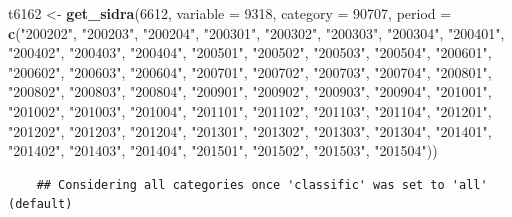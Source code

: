 \documentclass[11pt, a4paper]{report}
\newenvironment{Shaded}{\begin{snugshade}}{\end{snugshade}}
\newcommand{\DataTypeTok}[1]{\textcolor[rgb]{0.13,0.29,0.53}{#1}}
\newcommand{\DecValTok}[1]{\textcolor[rgb]{0.00,0.00,0.81}{#1}}
\newcommand{\KeywordTok}[1]{\textcolor[rgb]{0.13,0.29,0.53}{\textbf{#1}}}
\newcommand{\NormalTok}[1]{#1}
\newcommand{\StringTok}[1]{\textcolor[rgb]{0.31,0.60,0.02}{#1}}
\theoremstyle{plain}
\theoremstyle{plain}
\theoremstyle{remark}
\begin{document}
\begin{Shaded}
	\begin{Highlighting}[]
		\NormalTok{t6162 <-}\StringTok{ }\KeywordTok{get_sidra}\NormalTok{(}\DecValTok{6612}\NormalTok{, }\DataTypeTok{variable =} \DecValTok{9318}\NormalTok{, }\DataTypeTok{category =} \DecValTok{90707}\NormalTok{, }\DataTypeTok{period =} \KeywordTok{c}\NormalTok{(}\StringTok{"200202"}\NormalTok{, }
		\StringTok{"200203"}\NormalTok{, }\StringTok{"200204"}\NormalTok{, }\StringTok{"200301"}\NormalTok{, }\StringTok{"200302"}\NormalTok{, }\StringTok{"200303"}\NormalTok{, }\StringTok{"200304"}\NormalTok{, }
		\StringTok{"200401"}\NormalTok{, }\StringTok{"200402"}\NormalTok{, }\StringTok{"200403"}\NormalTok{, }\StringTok{"200404"}\NormalTok{, }\StringTok{"200501"}\NormalTok{, }\StringTok{"200502"}\NormalTok{, }
		\StringTok{"200503"}\NormalTok{, }\StringTok{"200504"}\NormalTok{, }\StringTok{"200601"}\NormalTok{, }\StringTok{"200602"}\NormalTok{, }\StringTok{"200603"}\NormalTok{, }\StringTok{"200604"}\NormalTok{, }
		\StringTok{"200701"}\NormalTok{, }\StringTok{"200702"}\NormalTok{, }\StringTok{"200703"}\NormalTok{, }\StringTok{"200704"}\NormalTok{, }\StringTok{"200801"}\NormalTok{, }\StringTok{"200802"}\NormalTok{, }
		\StringTok{"200803"}\NormalTok{, }\StringTok{"200804"}\NormalTok{, }\StringTok{"200901"}\NormalTok{, }\StringTok{"200902"}\NormalTok{, }\StringTok{"200903"}\NormalTok{, }\StringTok{"200904"}\NormalTok{, }
		\StringTok{"201001"}\NormalTok{, }\StringTok{"201002"}\NormalTok{, }\StringTok{"201003"}\NormalTok{, }\StringTok{"201004"}\NormalTok{, }\StringTok{"201101"}\NormalTok{, }\StringTok{"201102"}\NormalTok{, }
		\StringTok{"201103"}\NormalTok{, }\StringTok{"201104"}\NormalTok{, }\StringTok{"201201"}\NormalTok{, }\StringTok{"201202"}\NormalTok{, }\StringTok{"201203"}\NormalTok{, }\StringTok{"201204"}\NormalTok{, }
		\StringTok{"201301"}\NormalTok{, }\StringTok{"201302"}\NormalTok{, }\StringTok{"201303"}\NormalTok{, }\StringTok{"201304"}\NormalTok{, }\StringTok{"201401"}\NormalTok{, }\StringTok{"201402"}\NormalTok{, }
		\StringTok{"201403"}\NormalTok{, }\StringTok{"201404"}\NormalTok{, }\StringTok{"201501"}\NormalTok{, }\StringTok{"201502"}\NormalTok{, }\StringTok{"201503"}\NormalTok{, }\StringTok{"201504"}\NormalTok{))}
	\end{Highlighting}
\end{Shaded}

\begin{verbatim}
	## Considering all categories once 'classific' was set to 'all' (default)
\end{verbatim}
\end{document}
